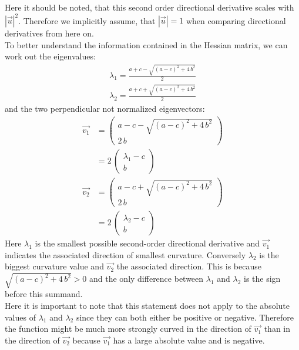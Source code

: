 \documentclass[12pt,english,twocolumn]{revtex4}
\begin{document}
Here it should be noted, that this second order directional derivative scales with $|\Vec{u}|^2$. Therefore we implicitly assume, that $|\Vec{u}| = 1$ when comparing directional derivatives from here on.\\
To better understand the information contained in the Hessian matrix, we can work out the eigenvalues:
\begin{align*}
    \lambda_1 = \frac{a + c - \sqrt{(a - c)^2 + 4\,b^2}}{2}\\
    \lambda_2 = \frac{a + c + \sqrt{(a - c)^2 + 4\,b^2}}{2}
\end{align*}
and the two perpendicular not normalized eigenvectors:
\begin{align*}
    \Vec{v_1} &= \left(
    \begin{array}{c}
         a - c - \sqrt{(a - c)^2 + 4\,b^2}\\
         2\,b
    \end{array}
    \right)\\
    &= 2\,\left(
    \begin{array}{c}
         \lambda_1 - c\\
         b
    \end{array}
    \right)
    \\
    \Vec{v_2} &= \left(
    \begin{array}{c}
         a - c + \sqrt{(a - c)^2 + 4\,b^2}\\
         2\,b
    \end{array}
    \right)\\
    &= 2\,\left(
    \begin{array}{c}
         \lambda_2 - c\\
         b
    \end{array}
    \right)
\end{align*}
Here $\lambda_1$ is the smallest possible second-order directional derivative and $\Vec{v_1}$ indicates the associated direction of smallest curvature. Conversely $\lambda_2$ is the biggest curvature value and $\Vec{v_2}$ the associated direction. This is because $\sqrt{(a - c)^2 + 4\,b^2} > 0$ and the only difference between $\lambda_1$ and $\lambda_2$ is the sign before this summand.\\
Here it is important to note that this statement does not apply to the absolute values of $\lambda_1$ and $\lambda_2$ since they can both either be positive or negative. Therefore the function might be much more strongly curved in the direction of $\Vec{v_1}$ than in the direction of $\Vec{v_2}$ because $\Vec{v_1}$ has a large absolute value and is negative.\\
\end{document}
